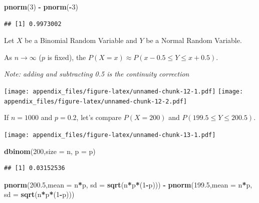 \documentclass[
]{book}
\newenvironment{Shaded}{\begin{snugshade}}{\end{snugshade}}
\newcommand{\AttributeTok}[1]{\textcolor[rgb]{0.13,0.29,0.53}{#1}}
\newcommand{\DecValTok}[1]{\textcolor[rgb]{0.00,0.00,0.81}{#1}}
\newcommand{\FloatTok}[1]{\textcolor[rgb]{0.00,0.00,0.81}{#1}}
\newcommand{\FunctionTok}[1]{\textcolor[rgb]{0.13,0.29,0.53}{\textbf{#1}}}
\newcommand{\NormalTok}[1]{#1}
\newcommand{\SpecialCharTok}[1]{\textcolor[rgb]{0.81,0.36,0.00}{\textbf{#1}}}
\begin{document}
\begin{Shaded}
\begin{Highlighting}[]
\FunctionTok{pnorm}\NormalTok{(}\DecValTok{3}\NormalTok{) }\SpecialCharTok{{-}} \FunctionTok{pnorm}\NormalTok{(}\SpecialCharTok{{-}}\DecValTok{3}\NormalTok{)}
\end{Highlighting}
\end{Shaded}

\begin{verbatim}
## [1] 0.9973002
\end{verbatim}

Let \(X\) be a Binomial Random Variable and \(Y\) be a Normal Random Variable.

As \(n\rightarrow \infty\) (\(p\) is fixed), the \(P(X = x) \approx P(x-0.5 \leq Y \leq x+0.5)\).

\emph{Note: adding and subtracting 0.5 is the continuity correction}

\texttt{[image: appendix\_files/figure-latex/unnamed-chunk-12-1.pdf]} \texttt{[image: appendix\_files/figure-latex/unnamed-chunk-12-2.pdf]}

If \(n=1000\) and \(p=0.2\), let's compare \(P(X=200)\) and \(P(199.5\leq Y\leq 200.5)\).

\texttt{[image: appendix\_files/figure-latex/unnamed-chunk-13-1.pdf]}

\begin{Shaded}
\begin{Highlighting}[]
\FunctionTok{dbinom}\NormalTok{(}\DecValTok{200}\NormalTok{,}\AttributeTok{size =}\NormalTok{ n, }\AttributeTok{p =}\NormalTok{ p)}
\end{Highlighting}
\end{Shaded}

\begin{verbatim}
## [1] 0.03152536
\end{verbatim}

\begin{Shaded}
\begin{Highlighting}[]
\FunctionTok{pnorm}\NormalTok{(}\FloatTok{200.5}\NormalTok{,}\AttributeTok{mean =}\NormalTok{ n}\SpecialCharTok{*}\NormalTok{p, }\AttributeTok{sd =} \FunctionTok{sqrt}\NormalTok{(n}\SpecialCharTok{*}\NormalTok{p}\SpecialCharTok{*}\NormalTok{(}\DecValTok{1}\SpecialCharTok{{-}}\NormalTok{p))) }\SpecialCharTok{{-}} \FunctionTok{pnorm}\NormalTok{(}\FloatTok{199.5}\NormalTok{,}\AttributeTok{mean =}\NormalTok{ n}\SpecialCharTok{*}\NormalTok{p, }\AttributeTok{sd =} \FunctionTok{sqrt}\NormalTok{(n}\SpecialCharTok{*}\NormalTok{p}\SpecialCharTok{*}\NormalTok{(}\DecValTok{1}\SpecialCharTok{{-}}\NormalTok{p)))}
\end{Highlighting}
\end{Shaded}
\end{document}
